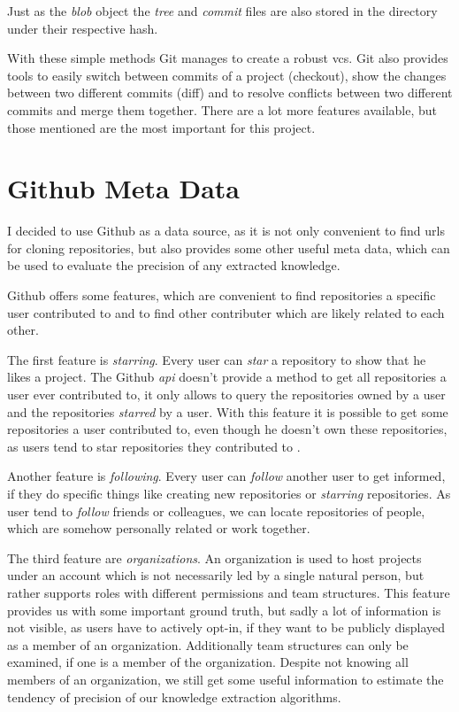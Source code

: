 Just as the \emph{blob} object the \emph{tree} and \emph{commit} files are also stored in the  directory under their respective hash.

With these simple methods Git manages to create a robust \ac{vcs}.
Git also provides tools to easily switch between commits of a project (checkout), show the changes between two different commits (diff) and to resolve conflicts between two different commits and merge them together.
There are a lot more features available, but those mentioned are the most important for this project.

\section{Github Meta Data}\label{github-meta-data}

I decided to use Github as a data source, as it is not only convenient to find \acp{url} for cloning repositories, but also provides some other useful meta data, which can be used to evaluate the precision of any extracted knowledge.

Github offers some features, which are convenient to find repositories a specific user contributed to and to find other contributer which are likely related to each other.

The first feature is \emph{starring}. Every user can \emph{star} a repository to show that he likes a project.
The Github \emph{api} doesn't provide a method to get all repositories a user ever contributed to, it only allows to query the repositories owned by a user and the repositories \emph{starred} by a user.
With this feature it is possible to get some repositories a user contributed to, even though he doesn't own these repositories, as users tend to star repositories they contributed to .

Another feature is \emph{following}. Every user can \emph{follow} another user to get informed, if they do specific things like creating new repositories or \emph{starring} repositories.
As user tend to  \emph{follow} friends or colleagues, we can locate repositories of people, which are somehow personally related or work together.

The third feature are \emph{organizations}.
An organization is used to host projects under an account which is not necessarily led by a single natural person, but rather supports roles with different permissions and team structures.
This feature provides us with some important ground truth, but sadly a lot of information is not visible, as users have to actively opt-in, if they want to be publicly displayed as a member of an organization.
Additionally team structures can only be examined, if one is a member of the organization.
Despite not knowing all members of an organization, we still get some useful information to estimate the tendency of precision of our knowledge extraction algorithms.


